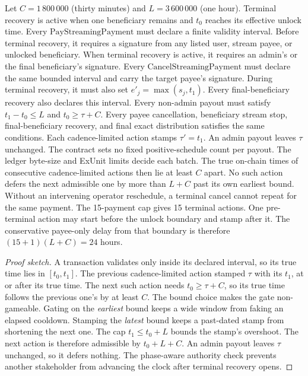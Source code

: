 \documentclass[11pt,DIV=11,parskip=half-]{scrartcl}
\begin{document}
\begin{theorem}
\label{thm:cadence}
Let $C = 1\,800\,000$ (thirty minutes) and $L = 3\,600\,000$ (one hour). Terminal recovery is active when one beneficiary remains and $t_0$ reaches its effective unlock time. Every $\mathrm{PayStreamingPayment}$ must declare a finite validity interval. Before terminal recovery, it requires a signature from any listed user, stream payee, or unlocked beneficiary. When terminal recovery is active, it requires an admin's or the final beneficiary's signature. Every $\mathrm{CancelStreamingPayment}$ must declare the same bounded interval and carry the target payee's signature. During terminal recovery, it must also set $e'_j=\max(s_j,t_1)$. Every final-beneficiary recovery also declares this interval. Every non-admin payout must satisfy $t_1 - t_0 \le L$ and $t_0 \ge \tau + C$. Every payee cancellation, beneficiary stream stop, final-beneficiary recovery, and final exact distribution satisfies the same conditions. Each cadence-limited action stamps $\tau' = t_1$. An admin payout leaves $\tau$ unchanged. The contract sets no fixed positive-schedule count per payout. The ledger byte-size and ExUnit limits decide each batch. The true on-chain times of consecutive cadence-limited actions then lie at least $C$ apart. No such action defers the next admissible one by more than $L + C$ past its own earliest bound. Without an intervening operator reschedule, a terminal cancel cannot repeat for the same payment. The 15-payment cap gives 15 terminal actions. One pre-terminal action may start before the unlock boundary and stamp after it. The conservative payee-only delay from that boundary is therefore $(15+1)(L+C)=24$ hours.
\end{theorem}
\begin{proof}[Proof sketch]
A transaction validates only inside its declared interval, so its true time lies in $[t_0, t_1]$. The previous cadence-limited action stamped $\tau$ with its $t_1$, at or after its true time. The next such action needs $t_0 \ge \tau + C$, so its true time follows the previous one's by at least $C$. The bound choice makes the gate non-gameable. Gating on the \emph{earliest} bound keeps a wide window from faking an elapsed cooldown. Stamping the \emph{latest} bound keeps a past-dated stamp from shortening the next one. The cap $t_1 \le t_0 + L$ bounds the stamp's overshoot. The next action is therefore admissible by $t_0 + L + C$. An admin payout leaves $\tau$ unchanged, so it defers nothing. The phase-aware authority check prevents another stakeholder from advancing the clock after terminal recovery opens.
\end{proof}
\end{document}

